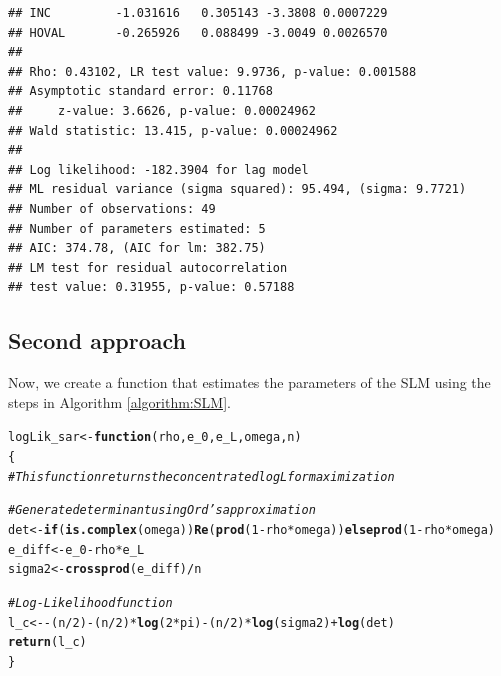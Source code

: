 \documentclass[english,12pt]{book}\usepackage[]{graphicx}\usepackage[]{xcolor}
\makeatletter
\newcommand{\hlnum}[1]{\textcolor[rgb]{0.686,0.059,0.569}{#1}}%
\newcommand{\hlcom}[1]{\textcolor[rgb]{0.678,0.584,0.686}{\textit{#1}}}%
\newcommand{\hlopt}[1]{\textcolor[rgb]{0,0,0}{#1}}%
\newcommand{\hlstd}[1]{\textcolor[rgb]{0.345,0.345,0.345}{#1}}%
\newcommand{\hlkwa}[1]{\textcolor[rgb]{0.161,0.373,0.58}{\textbf{#1}}}%
\newcommand{\hlkwb}[1]{\textcolor[rgb]{0.69,0.353,0.396}{#1}}%
\newcommand{\hlkwc}[1]{\textcolor[rgb]{0.333,0.667,0.333}{#1}}%
\newcommand{\hlkwd}[1]{\textcolor[rgb]{0.737,0.353,0.396}{\textbf{#1}}}%
\newenvironment{kframe}{%
 \def\at@end@of@kframe{}%
 \ifinner\ifhmode%
  \def\at@end@of@kframe{\end{minipage}}%
  \begin{minipage}{\columnwidth}%
 \fi\fi%
 \def\FrameCommand##1{\hskip\@totalleftmargin \hskip-\fboxsep
 \colorbox{shadecolor}{##1}\hskip-\fboxsep
     \hskip-\linewidth \hskip-\@totalleftmargin \hskip\columnwidth}%
 \MakeFramed {\advance\hsize-\width
   \@totalleftmargin\z@ \linewidth\hsize
   \@setminipage}}%
 {\par\unskip\endMakeFramed%
 \at@end@of@kframe}
\newenvironment{knitrout}{}{} %
\makeatother
\begin{document}
\begin{knitrout}
\begin{kframe}
\begin{verbatim}
## INC         -1.031616   0.305143 -3.3808 0.0007229
## HOVAL       -0.265926   0.088499 -3.0049 0.0026570
## 
## Rho: 0.43102, LR test value: 9.9736, p-value: 0.001588
## Asymptotic standard error: 0.11768
##     z-value: 3.6626, p-value: 0.00024962
## Wald statistic: 13.415, p-value: 0.00024962
## 
## Log likelihood: -182.3904 for lag model
## ML residual variance (sigma squared): 95.494, (sigma: 9.7721)
## Number of observations: 49 
## Number of parameters estimated: 5 
## AIC: 374.78, (AIC for lm: 382.75)
## LM test for residual autocorrelation
## test value: 0.31955, p-value: 0.57188
\end{verbatim}
\end{kframe}
\end{knitrout}

\subsection{Second approach}

Now, we create a function that estimates the parameters of the SLM using the steps in  Algorithm \eqref{algorithm:SLM}.

\begin{knitrout}
\color{fgcolor}\begin{kframe}
\begin{alltt}
\hlstd{logLik_sar} \hlkwb{<-} \hlkwa{function}\hlstd{(}\hlkwc{rho}\hlstd{,} \hlkwc{e_0}\hlstd{,} \hlkwc{e_L}\hlstd{,} \hlkwc{omega}\hlstd{,} \hlkwc{n}\hlstd{)}
\hlstd{\{}
  \hlcom{# This function returns the concentrated log L for maximization}

  \hlcom{#Generate determinant using Ord's approximation}
  \hlstd{det}    \hlkwb{<-} \hlkwa{if} \hlstd{(}\hlkwd{is.complex}\hlstd{(omega))} \hlkwd{Re}\hlstd{(}\hlkwd{prod}\hlstd{(}\hlnum{1} \hlopt{-} \hlstd{rho} \hlopt{*} \hlstd{omega))} \hlkwa{else} \hlkwd{prod}\hlstd{(}\hlnum{1} \hlopt{-} \hlstd{rho} \hlopt{*} \hlstd{omega)}
  \hlstd{e_diff} \hlkwb{<-} \hlstd{e_0} \hlopt{-} \hlstd{rho} \hlopt{*} \hlstd{e_L}
  \hlstd{sigma2} \hlkwb{<-} \hlkwd{crossprod}\hlstd{(e_diff)} \hlopt{/} \hlstd{n}

  \hlcom{#Log-Likelihood function}
  \hlstd{l_c}    \hlkwb{<-} \hlopt{-} \hlstd{(n} \hlopt{/} \hlnum{2}\hlstd{)} \hlopt{-} \hlstd{(n} \hlopt{/} \hlnum{2}\hlstd{)} \hlopt{*} \hlkwd{log}\hlstd{(}\hlnum{2} \hlopt{*} \hlstd{pi)} \hlopt{-} \hlstd{(n} \hlopt{/} \hlnum{2}\hlstd{)} \hlopt{*} \hlkwd{log}\hlstd{(sigma2)} \hlopt{+} \hlkwd{log}\hlstd{(det)}
  \hlkwd{return}\hlstd{(l_c)}
\hlstd{\}}
\end{alltt}
\end{kframe}
\end{knitrout}
\end{document}
